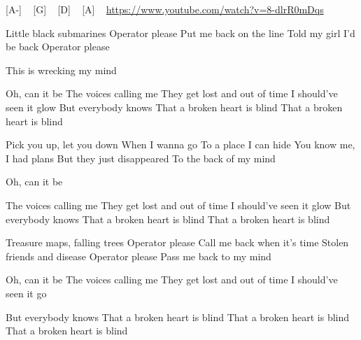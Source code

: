 
[A-] ~ [G] ~ [D] ~ [A] ~
\url{https://www.youtube.com/watch?v=8-dlrR0mDqs}

 Little black submarines
Operator please
Put me back on the line
Told my girl I'd be back
Operator please

This is wrecking my mind

Oh, can it be
The voices calling me
They get lost and out of time
I should've seen it glow
But everybody knows
That a broken heart is blind
That a broken heart is blind

Pick you up, let you down
When I wanna go
To a place I can hide
You know me, I had plans
But they just disappeared
To the back of my mind

Oh, can it be

The voices calling me
They get lost and out of time
I should've seen it glow
But everybody knows
That a broken heart is blind
That a broken heart is blind

Treasure maps, falling trees
Operator please
Call me back when it's time
Stolen friends and disease
Operator please
Pass me back to my mind

Oh, can it be
The voices calling me
They get lost and out of time
I should've seen it go

But everybody knows
That a broken heart is blind
That a broken heart is blind
That a broken heart is blind
